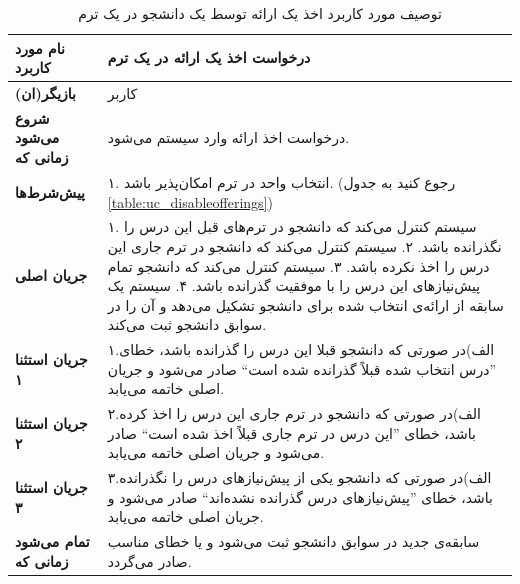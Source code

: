 \begin{table}
\begin{center}
\begin{tabular}{|p{4cm}|p{12cm}|}
	\hline
	\textbf{نام مورد کاربرد} &
درخواست اخذ یک ارائه در یک ترم\\
	\hline
	\textbf{بازیگر(ان)} &
کاربر\\
	\hline
	\textbf{شروع می‌شود زمانی که} &
درخواست اخذ ارائه وارد سیستم می‌شود.\\
	\hline
	\textbf{پیش‌شرط‌ها} &
۱. ‌انتخاب واحد در ترم امکان‌پذیر باشد. (رجوع کنید به جدول \ref{table:uc_disableofferings})\\
	\hline
	\textbf{جریان اصلی} &
۱. سیستم کنترل می‌کند که دانشجو در ترم‌های قبل این درس را نگذرانده باشد.\newline
۲. سیستم کنترل می‌کند که دانشجو در ترم‌ جاری این درس را اخذ نکرده باشد.\newline
۳. سیستم کنترل می‌کند که دانشجو تمام پیش‌نیاز‌های این درس را با موفقیت گذرانده باشد.\newline
۴. سیستم یک سابقه از ارائه‌ی انتخاب شده برای دانشجو تشکیل می‌دهد و آن را در سوابق دانشجو ثبت می‌کند.\\
	\hline
\textbf{جریان استثنا ۱} &
۱.الف)در صورتی که دانشجو قبلا این درس را گذرانده باشد، خطای ''درس انتخاب شده قبلاً گذرانده شده است`` صادر می‌شود و جریان اصلی خاتمه می‌یابد.\\
	\hline
\textbf{جریان استثنا ۲} &
۲.الف)در صورتی که دانشجو در ترم جاری این درس را اخذ کرده باشد، خطای ''این درس در ترم جاری قبلاً اخذ شده است`` صادر می‌شود و جریان اصلی خاتمه می‌یابد.\\
	\hline
\textbf{جریان استثنا ۳} &
۳.الف)در صورتی که دانشجو یکی از پیش‌نیاز‌های درس‌ را نگذرانده باشد، خطای ''پیش‌نیازهای درس گذرانده نشده‌اند`` صادر می‌شود و جریان اصلی خاتمه می‌یابد.\\
	\hline
	\textbf{تمام می‌شود زمانی که} &
سابقه‌ی جدید در سوابق دانشجو ثبت می‌شود و یا خطای مناسب صادر می‌گردد.\\
	\hline
\end{tabular}
\caption{\label{table:uc_takecoure} توصیف مورد کاربرد اخذ یک ارائه توسط یک دانشجو در یک ترم}
\end{center}
\end{table}

